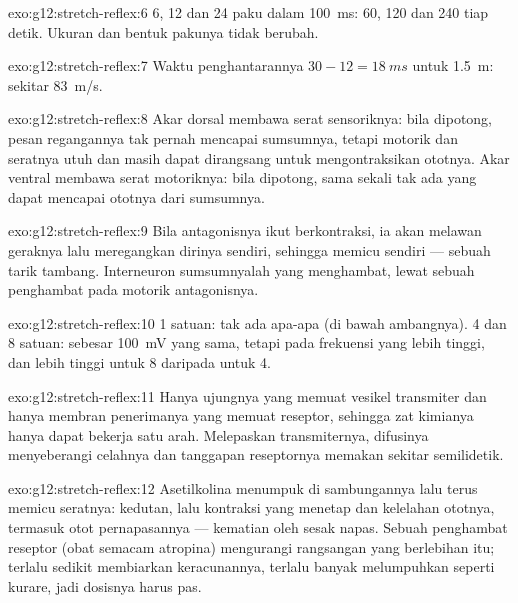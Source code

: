 \begin{solution}{exo:g12:stretch-reflex:6}
6, 12 dan 24 paku dalam \qty{100}{ms}: 60, 120 dan 240 tiap detik.
Ukuran dan bentuk pakunya tidak berubah.
\end{solution}

\begin{solution}{exo:g12:stretch-reflex:7}
Waktu penghantarannya $30 - 12 = \qty{18}{ms}$ untuk \qty{1.5}{m}:
sekitar \qty{83}{m/s}.
\end{solution}

\begin{solution}{exo:g12:stretch-reflex:8}
Akar dorsal membawa serat sensoriknya: bila dipotong, pesan regangannya
tak pernah mencapai sumsumnya, tetapi  motorik dan seratnya utuh
dan masih dapat dirangsang untuk mengontraksikan ototnya. Akar ventral
membawa serat motoriknya: bila dipotong, sama sekali tak ada yang dapat
mencapai ototnya dari sumsumnya.
\end{solution}

\begin{solution}{exo:g12:stretch-reflex:9}
Bila antagonisnya ikut berkontraksi, ia akan melawan geraknya lalu
meregangkan dirinya sendiri, sehingga memicu  sendiri ---
sebuah tarik tambang. Interneuron sumsumnyalah yang menghambat, lewat
sebuah  penghambat pada  motorik antagonisnya.
\end{solution}

\begin{solution}{exo:g12:stretch-reflex:10}
1 satuan: tak ada apa-apa (di bawah ambangnya). 4 dan 8 satuan:
 sebesar \qty{100}{mV} yang sama, tetapi pada frekuensi
yang lebih tinggi, dan lebih tinggi untuk 8 daripada untuk 4.
\end{solution}

\begin{solution}{exo:g12:stretch-reflex:11}
Hanya ujungnya yang memuat vesikel transmiter dan hanya membran
penerimanya yang memuat reseptor, sehingga zat kimianya hanya dapat
bekerja satu arah. Melepaskan transmiternya, difusinya menyeberangi
celahnya dan tanggapan reseptornya memakan sekitar semilidetik.
\end{solution}

\begin{solution}{exo:g12:stretch-reflex:12}
Asetilkolina menumpuk di sambungannya lalu terus memicu seratnya:
kedutan, lalu kontraksi yang menetap dan kelelahan ototnya, termasuk
otot pernapasannya --- kematian oleh sesak napas. Sebuah penghambat
reseptor (obat semacam atropina) mengurangi rangsangan yang
berlebihan itu; terlalu sedikit membiarkan keracunannya, terlalu banyak
melumpuhkan seperti kurare, jadi dosisnya harus pas.
\end{solution}

